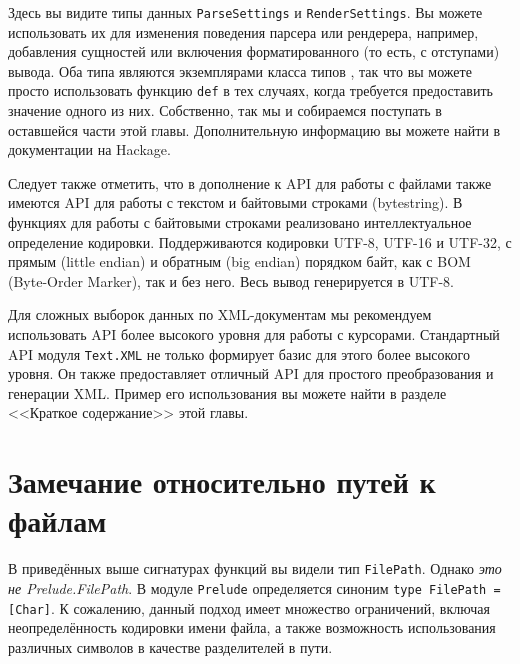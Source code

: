 Здесь вы видите типы данных \lstinline!ParseSettings! и \lstinline!RenderSettings!. Вы можете использовать их для изменения поведения парсера или рендерера, например, добавления сущностей или включения форматированного (то есть, с отступами) вывода. Оба типа являются экземплярами класса типов , так что вы можете просто использовать функцию \lstinline!def! в тех случаях, когда требуется предоставить значение одного из них. Собственно, так мы и собираемся поступать в оставшейся части этой главы. Дополнительную информацию вы можете найти в документации на Hackage.

Следует также отметить, что в дополнение к API для работы с файлами также имеются API для работы с текстом и байтовыми строками (bytestring). В функциях для работы с байтовыми строками реализовано интеллектуальное определение кодировки. Поддерживаются кодировки UTF-8, UTF-16 и UTF-32, с прямым (little endian) и обратным (big endian) порядком байт, как с BOM (Byte-Order Marker), так и без него. Весь вывод генерируется в UTF-8.

Для сложных выборок данных по XML-документам мы рекомендуем использовать API более высокого уровня для работы с курсорами. Стандартный API модуля \lstinline!Text.XML! не только формирует базис для этого более высокого уровня. Он также предоставляет отличный API для простого преобразования и генерации XML. Пример его использования вы можете найти в разделе <<Краткое содержание>> этой главы.

\section{Замечание относительно путей к файлам}
В приведённых выше сигнатурах функций вы видели тип \lstinline!FilePath!. Однако \emph{это не Prelude.FilePath}. В модуле \lstinline!Prelude! определяется синоним \lstinline!type FilePath = [Char]!. К сожалению, данный подход имеет множество ограничений, включая неопределённость кодировки имени файла, а также возможность использования различных символов в качестве разделителей в пути.


